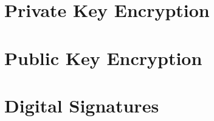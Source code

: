 \documentclass[10pt,fleqn]{report}
\begin{document}
\part{Private Key Encryption}











\part{Public Key Encryption}









\part{Digital Signatures}




\end{document}
